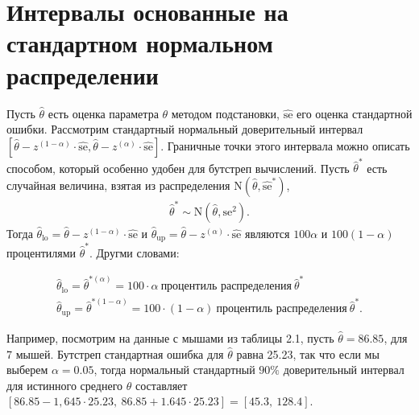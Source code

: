 \section{Интервалы основанные на стандартном нормальном распределении}
Пусть $\widehat{\theta}$ есть оценка параметра $\theta$ методом подстановки, $\widehat{\text{se}}$ его оценка стандартной ошибки. Рассмотрим стандартный нормальный доверительный интервал $[ \widehat{\theta} - z^{(1 - \alpha)} \cdot \widehat{\text{se}}, \widehat{\theta} - z^{(\alpha)}\cdot \widehat{\text{se}}]$. Граничные точки этого интервала можно описать способом, который особенно удобен для бутстреп вычислений. Пусть $\widehat{\theta}^{*}$  есть случайная величина, взятая из распределения $\mathrm{N}(\widehat{\theta}, \widehat{\text{se}}^{*})$,
\begin{gather}\label{13.1}
\widehat{\theta}^{*}\sim \mathrm{N}(\widehat{\theta}, \text{se}^{2}).
\end{gather}
Тогда $\widehat{\theta}_{\text{lo}} = \widehat{\theta}  - z^{(1 - \alpha)} \cdot \widehat{\text{se}} $ и $\widehat{\theta}_{\text{up}} = \widehat{\theta}  - z^{(\alpha)} \cdot \widehat{\text{se}}$  являются $100\alpha$ и $100(1 - \alpha)$ процентилями $\widehat{\theta}^{*}$. Другми словами:

\begin{gather}\label{13.2}
\widehat{\theta}_{\text{lo}} = \widehat{\theta}^{*(\alpha)} = 100 \cdot \alpha \ \text{процентиль распределения} \  \widehat{\theta}^{*} \\
\widehat{\theta}_{\text{up}} = \widehat{\theta}^{*(1 - \alpha)} = 100 \cdot (1 - \alpha) \  \text{процентиль распределения} \  \widehat{\theta}^{*}.
\end{gather}

Например, посмотрим на данные с мышами из таблицы 2.1, пусть $\widehat{\theta} = 86.85$, для 7 мышей. Бутстреп стандартная ошибка для $\widehat{\theta}$ равна 25.23, так что если мы выберем $\alpha = 0.05$, тогда нормальный стандартный $90\%$ доверительный интервал для истинного среднего  $\theta$  составляет $[86.85 - 1,645 \cdot 25.23, \ 86.85 + 1.645 \cdot 25.23] = [45.3,\ 128.4]$.


